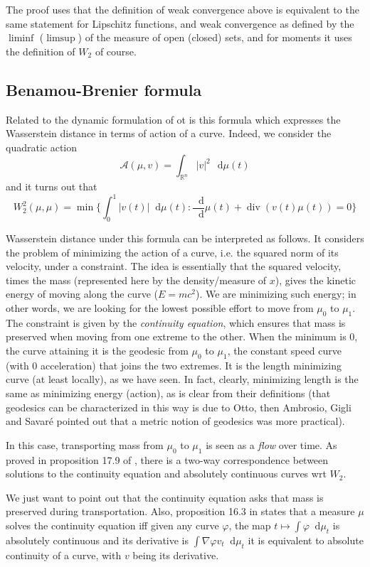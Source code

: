 \documentclass[a4paper,12pt,reqno]{amsbook}
\theoremstyle{definition} %
\newcommand*\de{\mathop{}\!\mathrm{d}}
\newcommand{\1}{\mathbbm{1}}
\newcommand{\A}{\mathcal{A}} %
\newcommand{\R}{\ensuremath{\mathbb{R}}}
\def\div{\mathop{\mathrm{div}}\nolimits}
\theoremstyle{plain}
\theoremstyle{remark}
\begin{document}
The proof uses that the definition of weak convergence above is equivalent to the same statement for Lipschitz functions, and weak convergence as defined by the $\liminf$ ($\limsup$) of the measure of open (closed) sets, and for moments it uses the definition of $W_2$ of course.

\subsection{Benamou-Brenier formula}
Related to the dynamic formulation of ot is this formula which expresses the Wasserstein distance in terms of action of a curve. Indeed, we consider the quadratic action 
\[
\A(\mu,v)=\int_{\R^n} |v|^2 \, \de \mu(t)
\]
and it turns out that 
\begin{equation}\label{eq: bb}
    W_2^2(\mu,\mu)=\min \bigg\{\int_0^1 |v(t)| \de\mu(t) : \frac{\de}{\de}\mu(t) + \div(v(t) \mu(t))=0 \bigg\}
\end{equation}

Wasserstein distance under this formula can be interpreted as follows. It considers the problem of minimizing the action of a curve, i.e. the squared norm of its velocity, under a constraint. The idea is essentially that the squared velocity, times the mass (represented here by the density/measure of $x$), gives the kinetic energy of moving along the curve ($E=mc^2$). We are minimizing such energy; in other words, we are looking for the lowest possible effort to move from $\mu_0$ to $\mu_1$. The constraint is given by the \emph{continuity equation}, which ensures that mass is preserved when moving from one extreme to the other. When the minimum is 0, the curve attaining it is the geodesic from $\mu_0$ to $\mu_1$, the constant speed curve (with 0 acceleration) that joins the two extremes. It is the length minimizing curve (at least locally), as we have seen. In fact, clearly, minimizing length is the same as minimizing energy (action), as is clear from their definitions (that geodesics can be characterized in this way is due to Otto, then Ambrosio, Gigli and Savaré pointed out that a metric notion of geodesics was more practical). 

In this case, transporting mass from $\mu_0$ to $\mu_1$ is seen as a \emph{flow} over time. As proved in proposition 17.9 of \cite{brue}, there is a two-way correspondence between solutions to the continuity equation and absolutely continuous curves wrt $W_2$. 

\begin{remark}
    We just want to point out that the continuity equation asks that mass is preserved during transportation. Also, proposition 16.3 in \cite{brue} states that a measure $\mu$ solves the continuity equation iff given any curve $\varphi$, the map $t\mapsto\int\varphi\de\mu_t$ is absolutely continuous and its derivative is $\int \nabla \varphi v_t \de \mu_t$ it is equivalent to absolute continuity of a curve, with $v$ being its derivative. 
\end{remark}
\end{document}
